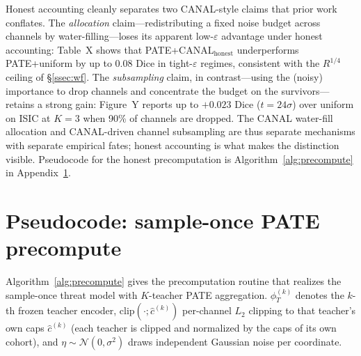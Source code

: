 Honest accounting cleanly separates two CANAL-style claims that prior
work conflates. The \emph{allocation} claim---redistributing a fixed
noise budget across channels by water-filling---loses its apparent
low-$\varepsilon$ advantage under honest accounting: Table~X shows
that PATE+CANAL$_{\text{honest}}$ underperforms PATE+uniform by up to
$0.08$ Dice in tight-$\varepsilon$ regimes, consistent with the
$R^{1/4}$ ceiling of \S\ref{ssec:wf}. The \emph{subsampling} claim,
in contrast---using the (noisy) importance to drop channels and
concentrate the budget on the survivors---retains a strong gain:
Figure~Y reports up to $+0.023$ Dice ($t{=}24\sigma$) over uniform on
ISIC at $K{=}3$ when 90\% of channels are dropped. The CANAL water-fill
allocation and CANAL-driven channel subsampling are thus separate
mechanisms with separate empirical fates; honest accounting is what
makes the distinction visible. Pseudocode for the honest precomputation
is Algorithm~\ref{alg:precompute} in Appendix~\ref{app:pseudocode}.

\appendix

\section{Pseudocode: sample-once PATE precompute}
\label{app:pseudocode}

Algorithm~\ref{alg:precompute} gives the precomputation routine that
realizes the sample-once threat model with $K$-teacher PATE
aggregation. $\phi_T^{(k)}$ denotes the $k$-th frozen teacher
encoder, $\mathrm{clip}(\cdot;\widehat{c}^{(k)})$ per-channel $L_2$
clipping to that teacher's own caps $\widehat{c}^{(k)}$ (each teacher is
clipped and normalized by the caps of its own cohort), and
$\eta\sim\mathcal{N}(0,\sigma^2)$ draws independent Gaussian noise per
coordinate.

